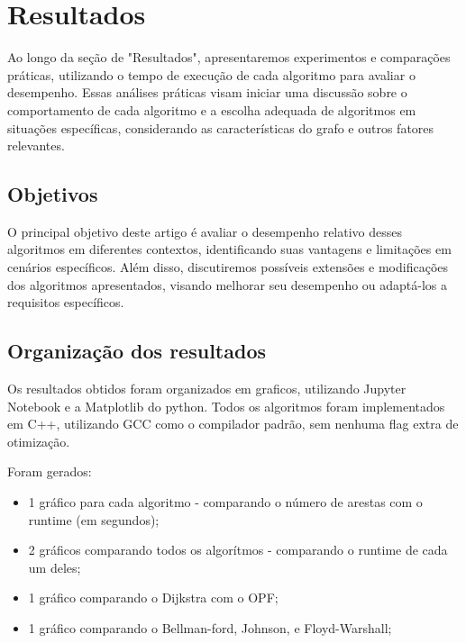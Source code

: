 \documentclass[12pt]{article}
\begin{document}
\section{Resultados}
Ao longo da seção de "Resultados", apresentaremos experimentos e comparações práticas, utilizando o tempo de execução de cada algoritmo para avaliar o desempenho. Essas análises práticas visam iniciar uma discussão sobre o comportamento de cada algoritmo e a escolha adequada de algoritmos em situações específicas, considerando as características do grafo e outros fatores relevantes.
\subsection{Objetivos}
O principal objetivo deste artigo é avaliar o desempenho relativo desses algoritmos em diferentes contextos, identificando suas vantagens e limitações em cenários específicos.
Além disso, discutiremos possíveis extensões e modificações dos algoritmos apresentados, visando melhorar seu desempenho ou adaptá-los a requisitos específicos.

\subsection{Organização dos resultados}
Os resultados obtidos foram organizados em graficos, utilizando Jupyter Notebook e a Matplotlib do python. Todos os algoritmos foram implementados em C++, utilizando GCC como o compilador padrão, sem nenhuma flag extra de otimização.

Foram gerados: 

\begin{itemize}
    \item 1 gráfico para cada algoritmo - comparando o número de arestas com o runtime (em segundos);
    \item 2 gráficos comparando todos os algorítmos - comparando o runtime de cada um deles;
    \item 1 gráfico comparando o Dijkstra com o OPF;
    \item 1 gráfico comparando o Bellman-ford, Johnson, e Floyd-Warshall;
\end{itemize}
\end{document}
